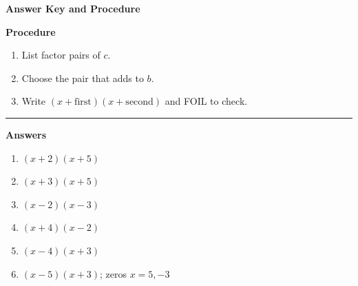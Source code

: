 \documentclass[12pt]{article}
\begin{document}
\begin{center}{\Large \textbf{Answer Key and Procedure}}\end{center}
\vspace{0.3cm}
\textbf{Procedure}
\begin{enumerate}
  \item List factor pairs of $c$.
  \item Choose the pair that adds to $b$.
  \item Write $(x+\text{first})(x+\text{second})$ and FOIL to check.
\end{enumerate}
\vspace{0.4cm}\hrule\vspace{0.4cm}
\textbf{Answers}
\begin{enumerate}[label=\textbf{\arabic*.}]
  \item $(x+2)(x+5)$
  \item $(x+3)(x+5)$
  \item $(x-2)(x-3)$
  \item $(x+4)(x-2)$
  \item $(x-4)(x+3)$
  \item $(x-5)(x+3)$; zeros $x=5,-3$
\end{enumerate}
\end{document}
